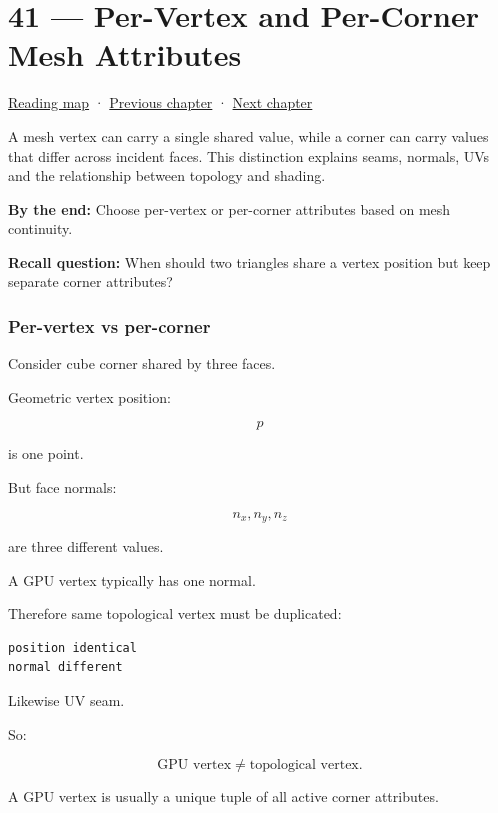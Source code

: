 \hypertarget{04-visual-computing-ii-ch041}{}
\chapter{41 --- Per-Vertex and Per-Corner Mesh Attributes}\label{04-visual-computing-ii-ch041-per-vertex-and-per-corner-mesh-attributes}

\hyperref[volume-reading-map]{Reading map} · \hyperref[04-visual-computing-ii-ch040-lighting-reconstruction-and-surface-motion]{Previous chapter} · \hyperref[04-visual-computing-ii-ch042-xr-radiometry-optics-and-perception]{Next chapter}

A mesh vertex can carry a single shared value, while a corner can carry values that differ across incident faces. This distinction explains seams, normals, UVs and the relationship between topology and shading.

\textbf{By the end:} Choose per-vertex or per-corner attributes based on mesh continuity.

\textbf{Recall question:} When should two triangles share a vertex position but keep separate corner attributes?

\subsection{Per-vertex vs per-corner}\label{04-visual-computing-ii-ch041-per-vertex-vs-per-corner}

Consider cube corner shared by three faces.

Geometric vertex position:

\[
p
\]

is one point.

But face normals:

\[
n_x,n_y,n_z
\]

are three different values.

A GPU vertex typically has one normal.

Therefore same topological vertex must be duplicated:

\begin{verbatim}
position identical
normal different
\end{verbatim}

Likewise UV seam.

So:

\[
\boxed{
\text{GPU vertex}
\neq
\text{topological vertex}.
}
\]

A GPU vertex is usually a unique tuple of all active corner attributes.

